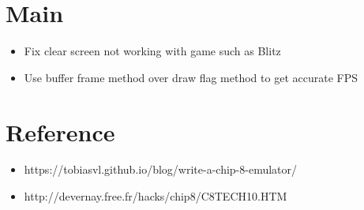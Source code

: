 \documentclass{article}
\begin{document}
\section*{Main}
\begin{itemize}
	\item Fix clear screen not working with game such as Blitz
	\item Use buffer frame method over draw flag method to get accurate FPS
\end{itemize}

\section*{Reference}
\begin{itemize}
	\item https://tobiasvl.github.io/blog/write-a-chip-8-emulator/
	\item http://devernay.free.fr/hacks/chip8/C8TECH10.HTM
\end{itemize}
\end{document}
